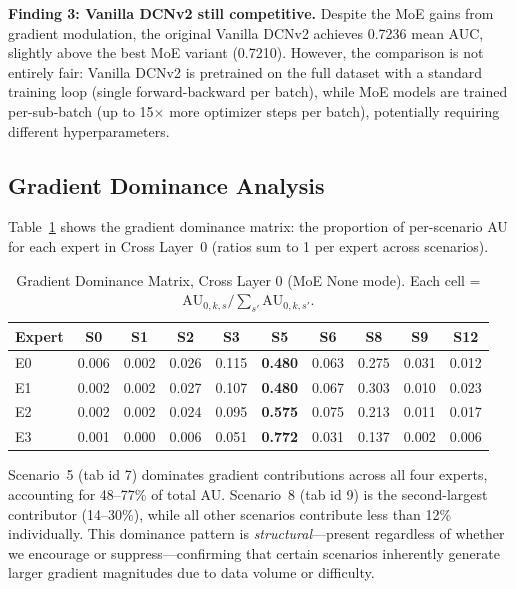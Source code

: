 \documentclass{article}
\begin{document}
\textbf{Finding 3: Vanilla DCNv2 still competitive.}
Despite the MoE gains from gradient modulation, the original Vanilla DCNv2 achieves 0.7236 mean AUC, slightly above the best MoE variant (0.7210).
However, the comparison is not entirely fair: Vanilla DCNv2 is pretrained on the full dataset with a standard training loop (single forward-backward per batch), while MoE models are trained per-sub-batch (up to 15$\times$ more optimizer steps per batch), potentially requiring different hyperparameters.

\subsection{Gradient Dominance Analysis}
\label{sec:analysis}

Table~\ref{tab:dominance} shows the gradient dominance matrix: the proportion of per-scenario AU for each expert in Cross Layer~0 (ratios sum to 1 per expert across scenarios).

\begin{table}[H]
\centering
\caption{Gradient Dominance Matrix, Cross Layer 0 (MoE None mode). Each cell = $\text{AU}_{0,k,s} / \sum_{s'} \text{AU}_{0,k,s'}$.}
\label{tab:dominance}
\small
\begin{tabular}{lccccccccc}
\toprule
\textbf{Expert} & \textbf{S0} & \textbf{S1} & \textbf{S2} & \textbf{S3} & \textbf{S5} & \textbf{S6} & \textbf{S8} & \textbf{S9} & \textbf{S12} \\
\midrule
E0 & 0.006 & 0.002 & 0.026 & 0.115 & \textbf{0.480} & 0.063 & 0.275 & 0.031 & 0.012 \\
E1 & 0.002 & 0.002 & 0.027 & 0.107 & \textbf{0.480} & 0.067 & 0.303 & 0.010 & 0.023 \\
E2 & 0.002 & 0.002 & 0.024 & 0.095 & \textbf{0.575} & 0.075 & 0.213 & 0.011 & 0.017 \\
E3 & 0.001 & 0.000 & 0.006 & 0.051 & \textbf{0.772} & 0.031 & 0.137 & 0.002 & 0.006 \\
\bottomrule
\end{tabular}
\end{table}

Scenario~5 (tab id 7) dominates gradient contributions across all four experts, accounting for 48--77\% of total AU.
Scenario~8 (tab id 9) is the second-largest contributor (14--30\%), while all other scenarios contribute less than 12\% individually.
This dominance pattern is \emph{structural}---present regardless of whether we encourage or suppress---confirming that certain scenarios inherently generate larger gradient magnitudes due to data volume or difficulty.
\end{document}
